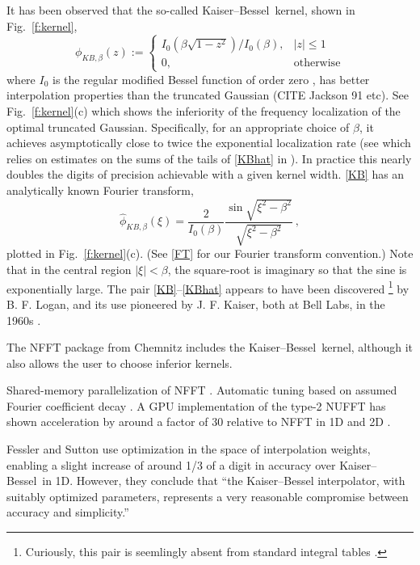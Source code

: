 \documentclass[10pt]{article}
\newcommand{\be}{\begin{equation}}
\newcommand{\ee}{\end{equation}}
\newcommand{\freq}{\beta}          %
\newcommand{\KB}{Kaiser--Bessel}
\begin{document}
It has been observed that the so-called
\KB\ kernel, shown in Fig.~\ref{f:kernel},
\be
\phi_{KB,\freq}(z) := \left\{
\begin{array}{ll}I_0(\freq\sqrt{1-z^2}) / I_0(\freq), & |z|\le 1\\
  0,& \mbox{otherwise}\end{array}\right.
\label{KB}
\ee
where $I_0$ is the regular modified Bessel function of order zero
\cite[(10.25.2)]{dlmf}, has better interpolation
properties than the truncated Gaussian
(CITE Jackson 91 etc).
See Fig.~\ref{f:kernel}(c) which shows the inferiority of the
frequency localization of the optimal truncated Gaussian.
Specifically, for an appropriate choice of $\freq$, it achieves
asymptotically close to twice the exponential localization rate
(see \cite[p.19, (C.1) vs (C.4)]{nfft} which relies on
estimates on the sums of the tails of \eqref{KBhat}
in \cite{fourmontthesis,fourmont,pottshabil}).
In practice this nearly doubles the digits of precision achievable with
a given kernel width.
\eqref{KB} has an analytically known Fourier transform,
\be
\hat\phi_{KB,\freq}(\xi) = \frac{2}{I_0(\freq)}
\frac{\sin \sqrt{\xi^2-\freq^2}}{\sqrt{\xi^2-\freq^2}}
~,
\label{KBhat}
\ee
plotted in Fig.~\ref{f:kernel}(c).
(See \eqref{FT} for our Fourier transform convention.)
Note that in the central region $|\xi|<\freq$,
the square-root is imaginary so that the sine is exponentially large.
The pair \eqref{KB}--\eqref{KBhat}
appears to have been discovered%
\footnote{Curiously, this pair is
  seemlingly absent from standard integral tables \cite[\S 6.677]{GS8}
\cite[\S 2.5.25]{prudnikov1} \cite[\S 2.5.10]{prudnikov2}.}
by B. F. Logan, and its use pioneered by J. F. Kaiser, both at
Bell Labs, in the 1960s \cite{kaiser,kaiserinterview}.

The NFFT package \cite{nfft} from Chemnitz
includes the \KB\ kernel, although it also allows the user to
choose inferior kernels.

Shared-memory parallelization of NFFT \cite{volkmer}.
Automatic tuning based on assumed Fourier coefficient decay \cite{nestler}.
A GPU implementation of the type-2 NUFFT has shown acceleration by around
a factor of 30 relative to NFFT in 1D and 2D \cite{cunfft}.

Fessler and Sutton \cite{fessler} use optimization in the space of
interpolation weights, enabling a slight increase of around 1/3 of a
digit in accuracy over \KB\ in 1D. However, they conclude that
``the
Kaiser--Bessel interpolator, with suitably optimized parameters,
represents a very reasonable compromise between accuracy and
simplicity.''
\end{document}
